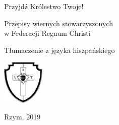 ﻿\documentclass{report}
\begin{document}
\pagestyle{plain}




%
%
\begin{titlepage}
\begin{center}


Przyjdź Królestwo Twoje!


\vspace*{6cm}


{\LARGE Przepisy wiernych stowarzyszonych\\w Federacji Regnum Christi}


Tłumaczenie z języka hiszpańskiego
            
\vspace*{1cm}


\includegraphics[width=2cm]{rc-logo-bw-712-755}


\vspace*{1cm}


\vfill


Rzym, 2019


            
\end{center}
\end{titlepage}


\tableofcontents
\end{document}
